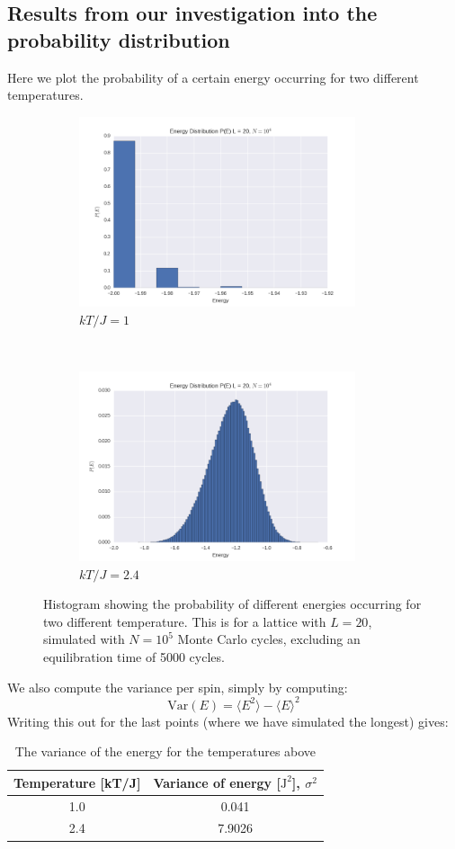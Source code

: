 \documentclass[a4paper, 10pt]{article}
\begin{document}
\subsection{Results from our investigation into the probability distribution}
Here we plot the probability of a certain energy occurring for two different temperatures.
\begin{figure}[!ht]
    \centering
    \begin{subfigure}[H!]{0.5\textwidth}
        \centering
        \includegraphics[height=2.2in]{energyDistHistoT1.png}
        \caption{$kT/J=1$}
    \end{subfigure}%
    ~ 
    \begin{subfigure}[H!]{0.5\textwidth}
        \centering
        \includegraphics[height=2.2in]{energyDistHisto.png}
        \caption{$kT/J=2.4$}
    \end{subfigure}
       \caption{Histogram showing the probability of different energies occurring for two different temperature. This is for a lattice with $L=20$, simulated with $N=10^5$ Monte Carlo cycles, excluding an equilibration time of 5000 cycles. }\label{fig:histograms}
\end{figure}
We also compute the variance per spin, simply by computing:
$$\mathrm{Var}(E)=\langle E^2 \rangle-\langle E \rangle^2 $$
Writing this out for the last points (where we have simulated the longest) gives:
\begin{table}[!hb]
\centering
\caption{The variance of the energy for the temperatures above}\label{tab:variance_energy}
\begin{tabular}{|c|c|}
\hline
Temperature [kT/J] & Variance of energy [$\mathrm{J}^2$], $\sigma^2$\\
\hline
1.0 &  0.041\\
2.4 & 7.9026\\
\hline	
\end{tabular}
\end{table}
\end{document}
